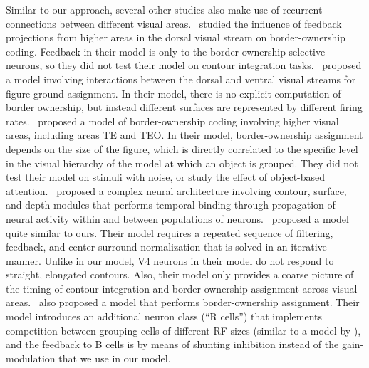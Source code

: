 Similar to our approach, several other studies
also make use of recurrent connections between different visual
areas.~\citet{Zwickel_etal07} studied the influence of feedback
projections from higher areas in the dorsal visual stream on
border-ownership coding. Feedback in their model is only to the
border-ownership selective neurons, so they did not test their model
on contour integration tasks.~\citet{Domijan_Setic08} proposed a model
involving interactions between the dorsal and ventral visual streams
for figure-ground assignment. In their model, there is no explicit
computation of border ownership, but instead different surfaces are
represented by different firing rates.~\citet{Jehee_etal07b} proposed
a model of border-ownership coding involving higher visual areas,
including areas TE and TEO. In their model, border-ownership
assignment depends on the size of the figure, which is directly
correlated to the specific level in the visual hierarchy of the model
at which an object is grouped. They did not test their model on
stimuli with noise, or study the effect of object-based
attention.~\citet{Sajda_Finkel95} proposed a complex neural
architecture involving contour, surface, and depth modules that
performs temporal binding through propagation of neural activity
within and between populations of neurons.~\citet{Tschechne_Neumann14}
proposed a model quite similar to ours. Their model requires a repeated
sequence of filtering, feedback, and center-surround normalization
that is solved in an iterative manner. Unlike in our model, V4 neurons
in their model do not respond to straight, elongated contours. Also,
their model only provides a coarse picture of the timing of contour
integration and border-ownership assignment across visual
areas.~\citet{Layton_etal12} also proposed a model that performs
border-ownership assignment. Their model introduces an additional neuron class (``R cells'') that
implements competition between grouping cells of different RF sizes
(similar to a model by \citet{Ardila_etal12}), and the feedback to B
cells is by means of shunting inhibition instead of the
gain-modulation that we use in our model.

